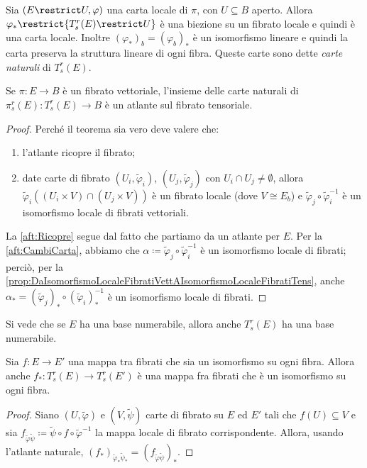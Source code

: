 Sia $(E\restrict U,\varphi)$ una carta locale di $\pi$, con $U\subseteq B$ aperto. Allora $\varphi_* \restrict{T_s^r(E)\restrict U}$ è una biezione su un fibrato locale e quindi è una carta locale.
Inoltre $(\varphi_*)_b = (\varphi_b)_*$ è un isomorfismo lineare e quindi la carta preserva la struttura lineare di ogni fibra. Queste carte sono dette \emph{carte naturali} di $T_s^r(E)$.


\begin{theorem} \label{thm:AtlanteFibratoTensoriale}
	Se $\pi: E \to B$ è un fibrato vettoriale, l'insieme delle carte naturali di $\pi_s^r(E):T_s^r(E) \to B$ è un atlante sul fibrato tensoriale.
\end{theorem}
\begin{proof}
	Perché il teorema sia vero deve valere che:
	\begin{enumerate}
		\item l'atlante ricopre il fibrato; \label{aft:Ricopre}
		\item date carte di fibrato $(U_i,\tilde\varphi_i)$, $(U_j,\tilde\varphi_j)$ con $U_i\cap U_j\not=\emptyset$, allora $\tilde\varphi_i( (U_i\times V) \cap (U_j\times V) )$ è un fibrato locale (dove $V\cong E_b$) e $\tilde\varphi_j\circ \tilde\varphi_i^{-1}$ è un isomorfismo locale di fibrati vettoriali. \label{aft:CambiCarta}
	\end{enumerate}
	La \ref{aft:Ricopre} segue dal fatto che partiamo da un atlante per $E$.
	Per la \ref{aft:CambiCarta}, abbiamo che $\alpha \coloneqq \tilde\varphi_j\circ \tilde\varphi_i^{-1}$ è un isomorfismo locale di fibrati; perciò, per la \cref{prop:DaIsomorfismoLocaleFibratiVettAIsomorfismoLocaleFibratiTens}, anche $\alpha_* = (\tilde\varphi_j)_*\circ (\tilde\varphi_i)_*^{-1}$ è un isomorfismo locale di fibrati.
\end{proof}

\begin{remark}
	Si vede che se $E$ ha una base numerabile, allora anche $T_s^r(E)$ ha una base numerabile. 
\end{remark}

\begin{proposition}
	Sia $f:E\to E'$ una mappa tra fibrati che sia un isomorfismo su ogni fibra. Allora anche $f_*:T_s^r(E) \to T_s^r(E')$ è una mappa fra fibrati che è un isomorfismo su ogni fibra.
\end{proposition}
\begin{proof}
	Siano $(U,\tilde\varphi)$ e $(V,\tilde\psi)$ carte di fibrato su $E$ ed $E'$ tali che $f(U) \subseteq V$ e sia $f_{\tilde\varphi\tilde\psi} \coloneqq \tilde\psi \circ f \circ \tilde\varphi^{-1}$ la mappa locale di fibrato corrispondente. Allora, usando l'atlante naturale, $(f_*)_{\tilde\varphi_*\tilde\psi_*} = (f_{\tilde\varphi\tilde\psi})_*$.
\end{proof}

